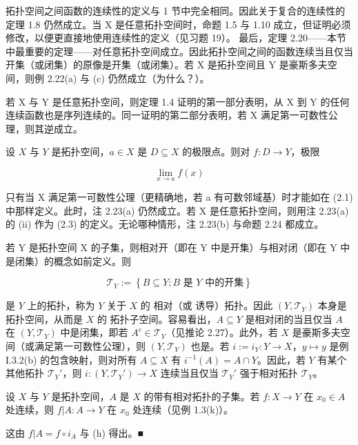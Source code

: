\begin{remark}
\begin{items}
\item

拓扑空间之间函数的连续性的定义与 1 节中完全相同。因此关于复合的连续性的定理 1.8 仍然成立。当 X 是任意拓扑空间时，命题 1.5 与 1.10 成立，但证明必须修改，以便更直接地使用连续性的定义（见习题 19）。
最后，定理 2.20——本节中最重要的定理——对任意拓扑空间成立。因此拓扑空间之间的函数连续当且仅当开集（或闭集）的原像是开集（或闭集）。若 X 是拓扑空间且 Y 是豪斯多夫空间，则例 2.22(a) 与 (c) 仍然成立（为什么？）。

\item

若 X 与 Y 是任意拓扑空间，则定理 1.4 证明的第一部分表明，从 X 到 Y 的任何连续函数也是序列连续的。同一证明的第二部分表明，若 X 满足第一可数性公理，则其逆成立。

\item

设 $X$ 与 $Y$ 是拓扑空间，$a \in X$ 是 $D \subseteq X$ 的极限点。则对 $f: D \to Y$，极限

\begin{equation}
\lim_{x\to a}f(x)
\end{equation}

\begin{subitems}
\item

只有当 X 满足第一可数性公理（更精确地，若 a 有可数邻域基）时才能如在 (2.1) 中那样定义。此时，注 2.23(a) 仍然成立。若 X 是任意拓扑空间，则用注 2.23(a) 的 (ii) 作为 (2.3) 的定义。无论哪种情形，注 2.23(b) 与命题 2.24 都成立。

\end{subitems}

\item

若 Y 是拓扑空间 X 的子集，则相对开（即在 Y 中是开集）与相对闭（即在 Y 中是闭集）的概念如前定义。则

\[
\mathcal{T}_{Y}:=\left\{B\subseteq Y;B\text{ 是 }Y\text{ 中的开集}\right\}
\]

是 $Y$ 上的拓扑，称为 $Y$ 关于 $X$ 的 $\text{相对}$（或 $\text{诱导}$）$\text{拓扑}$。因此 $(Y, \mathcal{T}_Y)$ 本身是拓扑空间，从而是 $X$ 的 $\text{拓扑子空间}$。容易看出，$A \subseteq Y$ 是相对闭的当且仅当 $A$ 在 $(Y, \mathcal{T}_Y)$ 中是闭集，即若 $A^c \in \mathcal{T}_Y$（见推论 2.27）。此外，若 $X$ 是豪斯多夫空间（或满足第一可数性公理），则 $(Y, \mathcal{T}_Y)$ 也是。若 $i := i_Y : Y \to X$，$y \mapsto y$ 是例 I.3.2(b) 的包含映射，则对所有 $A \subseteq X$ 有 $i^{-1}(A) = A \cap Y$。因此，若 $Y$ 有某个其他拓扑 $\mathcal{T}_Y'$，则 $i : (Y, \mathcal{T}_Y') \to X$ 连续当且仅当 $\mathcal{T}_Y'$ 强于相对拓扑 $\mathcal{T}_Y$。

\item

设 $X$ 与 $Y$ 是拓扑空间，$A$ 是 $X$ 的带有相对拓扑的子集。若 $f: X \to Y$ 在 $x_0 \in A$ 处连续，则 $f|A: A \to Y$ 在 $x_0$ 处连续（见例 1.3(k)）。

\proofhead
这由 $ f|A = f\circ i_A $ 与 (h) 得出。■
\end{items}

\end{remark}

